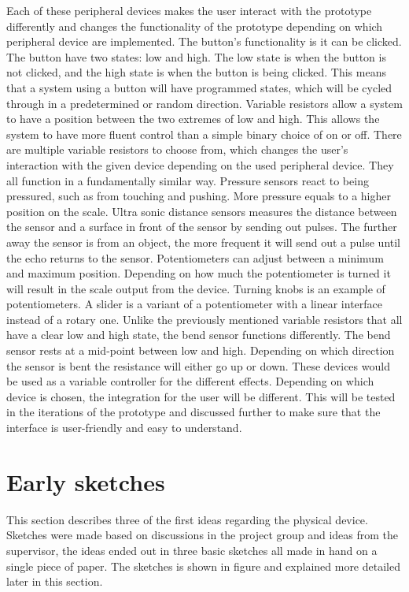 Each of these peripheral devices makes the user interact with the prototype differently and changes the functionality of the prototype depending on which peripheral device are implemented.
The button's functionality is it can be clicked. The button have two states: low and high. The low state is when the button is not clicked, and the high state is when the button is being clicked. This means that a system using a button will have programmed states, which will be cycled through in a predetermined or random direction.
Variable resistors allow a system to have a position between the two extremes of low and high. This allows the system to have more fluent control than a simple binary choice of on or off. There are multiple variable resistors to choose from, which changes the user's interaction with the given device depending on the used peripheral device.  They all function in a fundamentally similar way. 
Pressure sensors react to being pressured, such as from touching and pushing. More pressure equals to a higher position on the scale.
Ultra sonic distance sensors measures the distance between the sensor and a surface in front of the sensor by sending out pulses. The further away the sensor is from an object, the more frequent it will send out a pulse until the echo returns to the sensor. 
Potentiometers can adjust between a minimum and maximum position. Depending on how much the potentiometer is turned it will result in the scale output from the device. Turning knobs is an example of potentiometers. A slider is a variant of a potentiometer with a linear interface instead of a rotary one.
Unlike the previously mentioned variable resistors that all have a clear low and high state, the bend sensor functions differently. The bend sensor rests at a mid-point between low and high. Depending on which direction the sensor is bent the resistance will either go up or down.
These devices would be used as a variable controller for the different effects. Depending on which device is chosen, the integration for the user will be different. This will be tested in the iterations of the prototype and discussed further to make sure that the interface is user-friendly and easy to understand. 


\section{Early sketches}
This section describes three of the first ideas regarding the physical device. Sketches were made based on discussions in the project group and ideas from the supervisor, the ideas ended out in three basic sketches all made in hand on a single piece of paper. The sketches is shown in figure and explained more detailed later in this section. 

